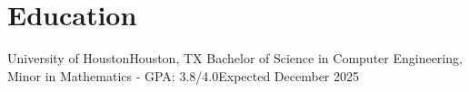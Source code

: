 \section{Education}
    \resumeSubHeadingListStart
    \resumeSubheading
    {University of Houston}{Houston, TX}
    {Bachelor of Science in Computer Engineering, Minor in Mathematics - GPA: 3.8/4.0}{Expected December 2025}
  \resumeSubHeadingListEnd
